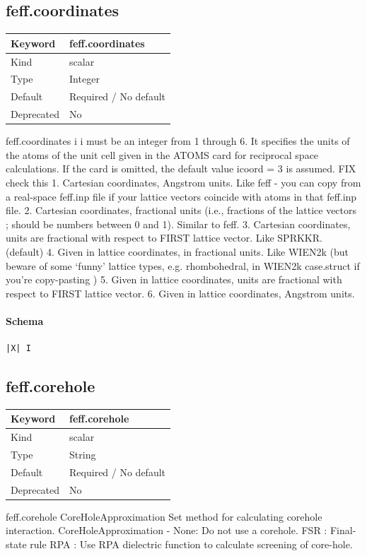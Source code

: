 \documentclass[11pt]{article}
\begin{document}
{{{\subsection{feff.coordinates}
\label{kw:feff-coordinates}
\begin{longtable}{|p{1.5in}|p{4.5in}|}
\hline
Keyword & feff.coordinates \\
\hline
Kind & scalar \\
\hline
Type & Integer \\
\hline
Default & Required / No default \\
\hline
Deprecated & No \\
\hline
\end{longtable}
 feff.coordinates{ i }
 i must be an integer from 1 through 6. It specifies the units of the atoms of the unit cell given
 in the ATOMS card for reciprocal space calculations. If the card is omitted, the default value
 icoord = 3 is assumed. FIX check this
 1. Cartesian coordinates, Angstrom units. Like feff - you can copy from a real-space
 feff.inp file if your lattice vectors coincide with atoms in that feff.inp file.
 2. Cartesian coordinates, fractional units (i.e., fractions of the lattice vectors ; should be
 numbers between 0 and 1). Similar to feff.
 3. Cartesian coordinates, units are fractional with respect to FIRST lattice vector. Like
 SPRKKR. (default)
 4. Given in lattice coordinates, in fractional units. Like WIEN2k (but beware of some
 ‘funny’ lattice types, e.g. rhombohedral, in WIEN2k case.struct if you’re copy-pasting )
 5. Given in lattice coordinates, units are fractional with respect to FIRST lattice vector.
 6. Given in lattice coordinates, Angstrom units.

\paragraph{Schema}
\begin{Verbatim}
|X| I
\end{Verbatim}

\subsection{feff.corehole}
\label{kw:feff-corehole}
\begin{longtable}{|p{1.5in}|p{4.5in}|}
\hline
Keyword & feff.corehole \\
\hline
Kind & scalar \\
\hline
Type & String \\
\hline
Default & Required / No default \\
\hline
Deprecated & No \\
\hline
\end{longtable}
 feff.corehole{ CoreHoleApproximation }
 Set method for calculating corehole interaction.
 CoreHoleApproximation -
                         None: Do not use a corehole.
                         FSR : Final-state rule
                         RPA : Use RPA dielectric function to calculate
                               screening of core-hole.

}}}
\end{document}
